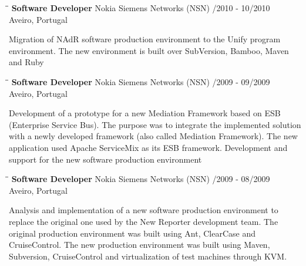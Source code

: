 \documentclass{res}
\begin{document}
\begin{resume}
\begin{tabbing}
\hspace{2.3in}\= \hspace{2.6in}\= \kill %
{\bf Software Developer} \>Nokia Siemens Networks (NSN)    
/2010 - 10/2010\\ \>Aveiro, Portugal
\end{tabbing}\vspace{-20pt}      %
Migration of NAdR software production environment to the Unify program
environment. The new environment is built over SubVersion, Bamboo, Maven and
Ruby

\begin{tabbing}
\hspace{2.3in}\= \hspace{2.6in}\= \kill %
{\bf Software Developer} \>Nokia Siemens Networks (NSN)    
/2009 - 09/2009\\ \>Aveiro, Portugal
\end{tabbing}\vspace{-20pt}      %
Development of a prototype for a new Mediation Framework based on ESB
(Enterprise Service Bus). The purpose was to integrate the implemented solution
with a newly developed framework (also called Mediation Framework). The new
application used Apache ServiceMix as its ESB framework. Development and support
for the new software production environment

\begin{tabbing}
\hspace{2.3in}\= \hspace{2.6in}\= \kill %
{\bf Software Developer} \>Nokia Siemens Networks (NSN)    
/2009 - 08/2009\\ \>Aveiro, Portugal
\end{tabbing}\vspace{-20pt}      %
Analysis and implementation of a new software production environment to replace
the original one used by the New Reporter development team. The original
production environment was built using Ant, ClearCase and CruiseControl. The new
production environment was built using Maven, Subversion, CruiseControl and
virtualization of test machines through KVM.


\end{resume}
\end{document}
